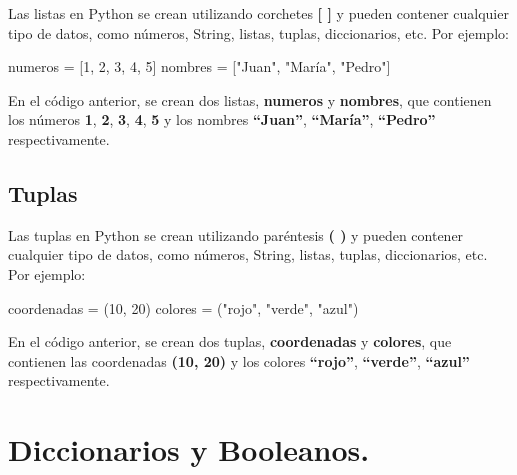\documentclass[
  a4paper,
  DIV=11,
  numbers=noendperiod,
  onepage,
  openany]{scrreprt}
\newenvironment{Shaded}{\begin{snugshade}}{\end{snugshade}}
\newcommand{\DecValTok}[1]{\textcolor[rgb]{0.68,0.00,0.00}{#1}}
\newcommand{\NormalTok}[1]{\textcolor[rgb]{0.00,0.23,0.31}{#1}}
\newcommand{\OperatorTok}[1]{\textcolor[rgb]{0.37,0.37,0.37}{#1}}
\newcommand{\StringTok}[1]{\textcolor[rgb]{0.13,0.47,0.30}{#1}}
\begin{document}
Las listas en Python se crean utilizando corchetes \textbf{{[} {]}} y
pueden contener cualquier tipo de datos, como números, String, listas,
tuplas, diccionarios, etc. Por ejemplo:

\begin{Shaded}
\begin{Highlighting}[]
\NormalTok{numeros }\OperatorTok{=}\NormalTok{ [}\DecValTok{1}\NormalTok{, }\DecValTok{2}\NormalTok{, }\DecValTok{3}\NormalTok{, }\DecValTok{4}\NormalTok{, }\DecValTok{5}\NormalTok{]}
\NormalTok{nombres }\OperatorTok{=}\NormalTok{ [}\StringTok{"Juan"}\NormalTok{, }\StringTok{"María"}\NormalTok{, }\StringTok{"Pedro"}\NormalTok{]}
\end{Highlighting}
\end{Shaded}

En el código anterior, se crean dos listas, \textbf{numeros} y
\textbf{nombres}, que contienen los números \textbf{1}, \textbf{2},
\textbf{3}, \textbf{4}, \textbf{5} y los nombres \textbf{``Juan''},
\textbf{``María''}, \textbf{``Pedro''} respectivamente.

\subsection{Tuplas}\label{tuplas}

Las tuplas en Python se crean utilizando paréntesis \textbf{( )} y
pueden contener cualquier tipo de datos, como números, String, listas,
tuplas, diccionarios, etc. Por ejemplo:

\begin{Shaded}
\begin{Highlighting}[]
\NormalTok{coordenadas }\OperatorTok{=}\NormalTok{ (}\DecValTok{10}\NormalTok{, }\DecValTok{20}\NormalTok{)}
\NormalTok{colores }\OperatorTok{=}\NormalTok{ (}\StringTok{"rojo"}\NormalTok{, }\StringTok{"verde"}\NormalTok{, }\StringTok{"azul"}\NormalTok{)}
\end{Highlighting}
\end{Shaded}

En el código anterior, se crean dos tuplas, \textbf{coordenadas} y
\textbf{colores}, que contienen las coordenadas \textbf{(10, 20)} y los
colores \textbf{``rojo''}, \textbf{``verde''}, \textbf{``azul''}
respectivamente.

\section{Diccionarios y Booleanos.}\label{diccionarios-y-booleanos.}
\end{document}
